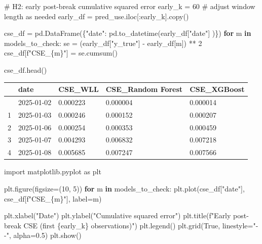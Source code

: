 \documentclass[
  letterpaper,
  DIV=11,
  numbers=noendperiod]{scrartcl}
\newenvironment{Shaded}{\begin{snugshade}}{\end{snugshade}}
\newcommand{\CommentTok}[1]{\textcolor[rgb]{0.37,0.37,0.37}{#1}}
\newcommand{\ControlFlowTok}[1]{\textcolor[rgb]{0.00,0.23,0.31}{\textbf{#1}}}
\newcommand{\DecValTok}[1]{\textcolor[rgb]{0.68,0.00,0.00}{#1}}
\newcommand{\FloatTok}[1]{\textcolor[rgb]{0.68,0.00,0.00}{#1}}
\newcommand{\ImportTok}[1]{\textcolor[rgb]{0.00,0.46,0.62}{#1}}
\newcommand{\KeywordTok}[1]{\textcolor[rgb]{0.00,0.23,0.31}{\textbf{#1}}}
\newcommand{\NormalTok}[1]{\textcolor[rgb]{0.00,0.23,0.31}{#1}}
\newcommand{\OperatorTok}[1]{\textcolor[rgb]{0.37,0.37,0.37}{#1}}
\newcommand{\SpecialCharTok}[1]{\textcolor[rgb]{0.37,0.37,0.37}{#1}}
\newcommand{\SpecialStringTok}[1]{\textcolor[rgb]{0.13,0.47,0.30}{#1}}
\newcommand{\StringTok}[1]{\textcolor[rgb]{0.13,0.47,0.30}{#1}}
\newcommand{\VariableTok}[1]{\textcolor[rgb]{0.07,0.07,0.07}{#1}}
\begin{document}
\begin{Shaded}
\begin{Highlighting}[]
\CommentTok{\# H2: early post{-}break cumulative squared error}
\NormalTok{early\_k }\OperatorTok{=} \DecValTok{60}  \CommentTok{\# adjust window length as needed}
\NormalTok{early\_df }\OperatorTok{=}\NormalTok{ pred\_use.iloc[:early\_k].copy()}

\NormalTok{cse\_df }\OperatorTok{=}\NormalTok{ pd.DataFrame(\{}\StringTok{"date"}\NormalTok{: pd.to\_datetime(early\_df[}\StringTok{"date"}\NormalTok{] )\})}
\ControlFlowTok{for}\NormalTok{ m }\KeywordTok{in}\NormalTok{ models\_to\_check:}
\NormalTok{    se }\OperatorTok{=}\NormalTok{ (early\_df[}\StringTok{"y\_true"}\NormalTok{] }\OperatorTok{{-}}\NormalTok{ early\_df[m]) }\OperatorTok{**} \DecValTok{2}
\NormalTok{    cse\_df[}\SpecialStringTok{f"CSE\_}\SpecialCharTok{\{}\NormalTok{m}\SpecialCharTok{\}}\SpecialStringTok{"}\NormalTok{] }\OperatorTok{=}\NormalTok{ se.cumsum()}

\NormalTok{cse\_df.head()}
\end{Highlighting}
\end{Shaded}

\begin{longtable}[]{@{}lllll@{}}
\toprule\noalign{}
& date & CSE\_WLL & CSE\_Random Forest & CSE\_XGBoost \\
\midrule\noalign{}
\endhead
\bottomrule\noalign{}
\endlastfoot
0 & 2025-01-02 & 0.000223 & 0.000004 & 0.000014 \\
1 & 2025-01-03 & 0.000246 & 0.000152 & 0.000207 \\
2 & 2025-01-06 & 0.000254 & 0.000353 & 0.000459 \\
3 & 2025-01-07 & 0.004293 & 0.006832 & 0.007218 \\
4 & 2025-01-08 & 0.005685 & 0.007247 & 0.007566 \\
\end{longtable}

\begin{Shaded}
\begin{Highlighting}[]
\ImportTok{import}\NormalTok{ matplotlib.pyplot }\ImportTok{as}\NormalTok{ plt}

\NormalTok{plt.figure(figsize}\OperatorTok{=}\NormalTok{(}\DecValTok{10}\NormalTok{, }\DecValTok{5}\NormalTok{))}
\ControlFlowTok{for}\NormalTok{ m }\KeywordTok{in}\NormalTok{ models\_to\_check:}
\NormalTok{    plt.plot(cse\_df[}\StringTok{"date"}\NormalTok{], cse\_df[}\SpecialStringTok{f"CSE\_}\SpecialCharTok{\{}\NormalTok{m}\SpecialCharTok{\}}\SpecialStringTok{"}\NormalTok{], label}\OperatorTok{=}\NormalTok{m)}

\NormalTok{plt.xlabel(}\StringTok{"Date"}\NormalTok{)}
\NormalTok{plt.ylabel(}\StringTok{"Cumulative squared error"}\NormalTok{)}
\NormalTok{plt.title(}\SpecialStringTok{f"Early post{-}break CSE (first }\SpecialCharTok{\{}\NormalTok{early\_k}\SpecialCharTok{\}}\SpecialStringTok{ observations)"}\NormalTok{)}
\NormalTok{plt.legend()}
\NormalTok{plt.grid(}\VariableTok{True}\NormalTok{, linestyle}\OperatorTok{=}\StringTok{"{-}{-}"}\NormalTok{, alpha}\OperatorTok{=}\FloatTok{0.5}\NormalTok{)}
\NormalTok{plt.show()}
\end{Highlighting}
\end{Shaded}
\end{document}
